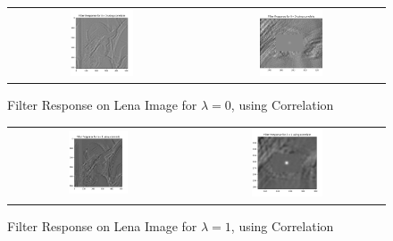 \documentclass[a4paper]{article}
\begin{document}
\begin{figure}[!ht]
\centering
\begin{tabular}{cc}
{\includegraphics[width=0.35\textwidth]{corr-filters/g0_corr}} &
{\includegraphics[width=0.35\textwidth]{corr-filters/g0_corr_zoom}}
\end{tabular}
\caption{Filter Response on Lena Image for $\lambda=0$, using Correlation}
\end{figure}

\begin{figure}[!ht]
\centering
\begin{tabular}{cc}
{\includegraphics[width=0.35\textwidth]{corr-filters/g1_corr}} &
{\includegraphics[width=0.38\textwidth]{corr-filters/g1_corr_zoom}}
\end{tabular}
\caption{Filter Response on Lena Image for $\lambda=1$, using Correlation}
\end{figure}
\end{document}

